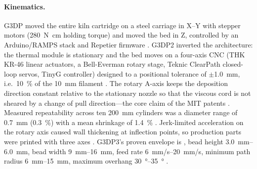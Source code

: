 \paragraph{Kinematics.} G3DP moved the entire kiln cartridge on a steel carriage in X--Y with stepper motors (\SI{280}{\newton\centi\metre} holding torque) and moved the bed in Z, controlled by an Arduino/RAMPS stack and Repetier firmware \citep{klein2015}. G3DP2 inverted the architecture: the thermal module is stationary and the bed moves on a four-axis CNC (THK KR-46 linear actuators, a Bell-Everman rotary stage, Teknic ClearPath closed-loop servos, TinyG controller) designed to a positional tolerance of \(\pm\)\SI{1.0}{mm}, i.e.\ \SI{10}{\percent} of the \SI{10}{mm} filament \citep{inamura2018}. The rotary A-axis keeps the deposition direction constant relative to the stationary nozzle so that the viscous cord is not sheared by a change of pull direction---the core claim of the MIT patents \citep{patent_us9919510,patent_us10464305}. Measured repeatability across ten \SI{200}{mm} cylinders was a diameter range of \SI{0.7}{mm} (\SI{0.3}{\percent}) with a mean shrinkage of \SI{1.4}{\percent} \citep{inamura2018}. Jerk-limited acceleration on the rotary axis caused wall thickening at inflection points, so production parts were printed with three axes \citep{inamura2018}. G3DP3's proven envelope is , bead height \SIrange{3.0}{6.0}{mm}, bead width \SIrange{9}{16}{mm}, feed rate \SIrange{6}{20}{mm/s}, minimum path radius \SIrange{6}{15}{mm}, maximum overhang \SIrange{30}{35}{\degree} \citep{mit2024masonry}.

